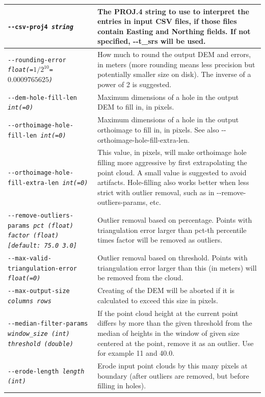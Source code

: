 \begin{longtable}{|p{8cm}|p{9cm}|}
\texttt{-\/-csv-proj4 \textit{string}} & The PROJ.4 string to use to
interpret the entries in input CSV files, if those files contain Easting
and Northing fields. If not specified, -\/-t\_srs will be used.  \\
\hline
\texttt{-\/-rounding-error \textit{float(=$1/2^{10}$=$0.0009765625$)}} & How much to round the output DEM and errors, in meters (more rounding means less precision but potentially smaller size on disk). The inverse of a power of 2 is suggested. \\ \hline
\texttt{-\/-dem-hole-fill-len \textit{int(=0)}} &  Maximum dimensions of a hole in the output DEM to fill in, in pixels. \\ \hline
\texttt{-\/-orthoimage-hole-fill-len \textit{int(=0)}} & Maximum dimensions of a hole in the output orthoimage to fill in, in pixels. See also -\/-orthoimage-hole-fill-extra-len.\\ \hline
\texttt{-\/-orthoimage-hole-fill-extra-len \textit{int(=0)}} & This value, in pixels, will make orthoimage hole filling more aggressive by first extrapolating the point cloud. A small value is suggested to avoid artifacts. Hole-filling also works better when less strict with outlier removal, such as in -\/-remove-outliers-params, etc.\\ \hline
\texttt{-\/-remove-outliers-params  \textit{pct (float) factor (float) [default: 75.0 3.0]}} & Outlier removal based on percentage. Points with triangulation error larger than pct-th percentile times factor will be removed as outliers. \\ \hline
\texttt{-\/-max-valid-triangulation-error \textit{float(=0)}} & Outlier removal based on threshold. Points with triangulation error larger than this (in meters) will be removed from the cloud. \\ \hline
\texttt{-\/-max-output-size \textit{columns rows} } & Creating of the DEM will be aborted if it is calculated to exceed this size in pixels. \\ \hline
\texttt{-\/-median-filter-params \textit{window\_size (int) threshold (double)}} & If the point cloud height at the current point differs by more than the given threshold from the median of heights in the window of given size centered at the point, remove it as an outlier. Use for example 11 and 40.0.\\ \hline
\texttt{-\/-erode-length \textit{length (int)}} & Erode input point clouds by this many pixels at boundary (after outliers are removed, but before filling in holes). \\ \hline


\end{longtable}
